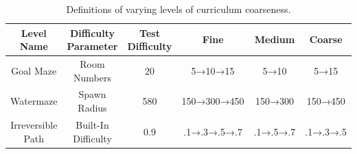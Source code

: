 \begin{table}[!htbp]
\caption{Definitions of varying levels of curriculum coarseness.}
\vspace{0.1in}
\centering
\begin{tabular}{@{}cccccc@{}}
\toprule
\textbf{Level Name} & \textbf{Difficulty Parameter} & \textbf{Test Difficulty} & \textbf{Fine} & \textbf{Medium} & \textbf{Coarse} \\ \midrule
Goal Maze           & Room Numbers                  & 20                       & 5→10→15       & 5→10            & 5→15            \\
Watermaze           & Spawn Radius                  & 580                      & 150→300→450   & 150→300         & 150→450         \\
Irreversible Path   & Built-In Difficulty           & 0.9                      & .1→.3→.5→.7   & .1→.5→.7        & .1→.3→.5        \\ \bottomrule
\end{tabular}
\label{supp:table:curriculum_granularity}
\end{table}
